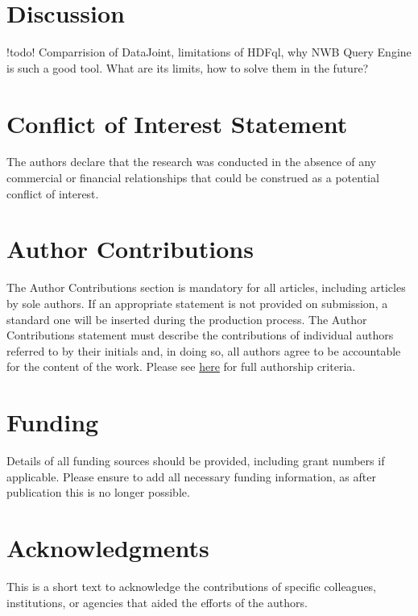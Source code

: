 \documentclass[utf8]{frontiersSCNS} %
\begin{document}
\section{Discussion}
\label{Discussion}

!todo! Comparrision of DataJoint, limitations of HDFql, why NWB Query Engine is such a good tool. What are its limits, how to solve them in the future?



\section*{Conflict of Interest Statement}

The authors declare that the research was conducted in the absence of any commercial or financial relationships that could be construed as a potential conflict of interest.

\section*{Author Contributions}

The Author Contributions section is mandatory for all articles, including articles by sole authors. If an appropriate statement is not provided on submission, a standard one will be inserted during the production process. The Author Contributions statement must describe the contributions of individual authors referred to by their initials and, in doing so, all authors agree to be accountable for the content of the work. Please see  \href{http://home.frontiersin.org/about/author-guidelines#AuthorandContributors}{here} for full authorship criteria.

\section*{Funding}
Details of all funding sources should be provided, including grant numbers if applicable. Please ensure to add all necessary funding information, as after publication this is no longer possible.

\section*{Acknowledgments}
This is a short text to acknowledge the contributions of specific colleagues, institutions, or agencies that aided the efforts of the authors.
\end{document}
